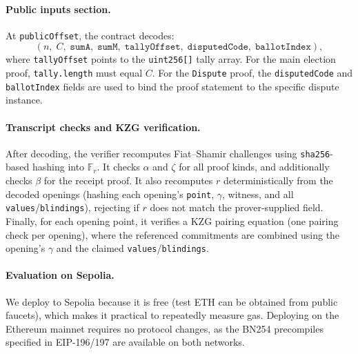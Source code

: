 \paragraph{Public inputs section.}
	At \texttt{publicOffset}, the contract decodes:
	\[
	(n,\; C,\; \texttt{sumA},\; \texttt{sumM},\; \texttt{tallyOffset},\; \texttt{disputedCode},\; \texttt{ballotIndex}),
	\]
	where \texttt{tallyOffset} points to the \texttt{uint256[]} tally array. 
	For the main election proof, \texttt{tally.length} must equal $C$.
	For the \texttt{Dispute} proof, the \texttt{disputedCode} and \texttt{ballotIndex} fields are used to bind the proof statement to the specific dispute instance.

\paragraph{Transcript checks and KZG verification.}
After decoding, the verifier recomputes Fiat--Shamir challenges using \texttt{sha256}-based hashing into $\mathbb{F}_r$.
It checks $\alpha$ and $\zeta$ for all proof kinds, and additionally checks $\beta$ for the receipt proof.
It also recomputes $r$ deterministically from the decoded openings (hashing each opening's \texttt{point}, $\gamma$, witness,
and all \texttt{values}/\texttt{blindings}), rejecting if $r$ does not match the prover-supplied field.
Finally, for each opening point, it verifies a KZG pairing equation (one pairing check per opening), where the referenced commitments
are combined using the opening's $\gamma$ and the claimed \texttt{values}/\texttt{blindings}.

\paragraph{Evaluation on Sepolia.}
We deploy to Sepolia because it is free (test ETH can be obtained from public faucets), which makes it practical to repeatedly measure gas.
Deploying on the Ethereum mainnet requires no protocol changes, as the BN254 precompiles specified in EIP-196/197 are available on both networks.

